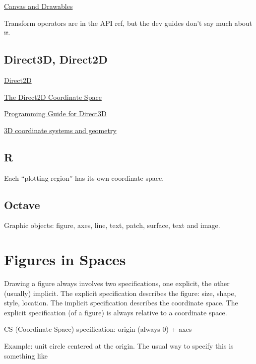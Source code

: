\documentclass{tufte-handout}
\numberwithin{equation}{subsection}
\begin{document}
\href{http://developer.android.com/guide/topics/graphics/2d-graphics.html}{Canvas and Drawables}

Transform operators are in the API ref, but the dev guides don't say much about it.

\subsection{Direct3D, Direct2D}
\label{subs:direct3d}


\href{http://msdn.microsoft.com/en-us/library/dd370990%28VS.85%29.aspx}{Direct2D}

\href{http://msdn.microsoft.com/en-us/library/dd756655(v=vs.85).aspx#the_direct2d_coordinate_space}{The Direct2D Coordinate Space}

\href{http://msdn.microsoft.com/en-us/library/windows/desktop/ff476345(v=vs.85).aspx}{Programming Guide for Direct3D}

\href{http://msdn.microsoft.com/en-us/library/windows/desktop/bb324489(v=vs.85).aspx}{3D coordinate systems and geometry}

\subsection{R}
\label{subs:r}

Each ``plotting region'' has its own coordinate space.

\subsection{Octave}
\label{subs:octave}

Graphic objects: figure, axes, line, text, patch, surface, text and image.

\section{Figures in Spaces}
\label{sec:draiwng}

Drawing a figure always involves two specifications, one explicit, the
other (usually) implicit.  The explicit specification describes the
figure: size, shape, style, location.  The implicit specification
describes the coordinate space.  The explicit specification (of a
figure) is always relative to a coordinate space.

CS (Coordinate Space) specification:  origin (always 0) + axes


Example: unit circle centered at the origin.  The usual way to specify
this is something like
\end{document}
